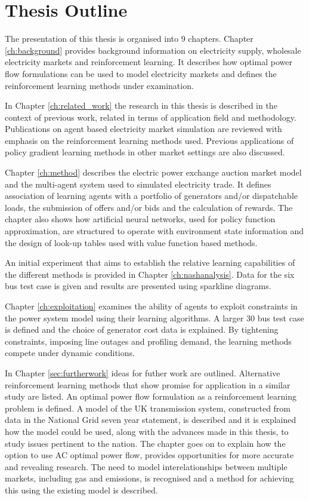 \section{Thesis Outline}
The presentation of this thesis is organised into 9 chapters.  Chapter
\ref{ch:background} provides background information on electricity supply,
wholesale electricity markets and reinforcement learning.  It describes how
optimal power flow formulations can be used to model electricity markets and
defines the reinforcement learning methods under examination.

In Chapter \ref{ch:related_work} the research in this thesis is described in
the context of previous work, related in terms of application field and
methodology.  Publications on agent based electricity market simulation are
reviewed with emphasis on the reinforcement learning methods used.
Previous applications of policy gradient learning methods in other market
settings are also discussed.

Chapter \ref{ch:method} describes the electric power exchange auction market
model and the multi-agent system used to simulated electricity trade.  It
defines association of learning agents with a portfolio of generators
and/or dispatchable loads, the submission of offers and/or bids and the
calculation of rewards. The chapter also shows how artificial neural networks,
used for policy function approximation, are structured to operate with
environment state information and the design of look-up tables used with value
function based methods.

An initial experiment that aims to establish the relative learning capabilities
of the different methods is provided in Chapter \ref{ch:nashanalysis}.  Data
for the six bus test case is given and results are presented using sparkline
diagrams.

Chapter \ref{ch:exploitation} examines the ability of agents to exploit
constraints in the power system model using their learning algorithms.  A
larger 30 bus test case is defined and the choice of generator cost data is
explained. By tightening constraints, imposing line outages and profiling
demand, the learning methods compete under dynamic conditions.

In Chapter \ref{sec:furtherwork} ideas for futher work are outlined.
Alternative reinforcement learning methods that show promise for
application in a similar study are listed.  An optimal power flow formulation
as a reinforcement learning problem is defined.  A model of the UK transmission
system, constructed from data in the National Grid seven year statement, is
described and it is explained how the model could be used, along with the
advances made in this thesis, to study issues pertinent to the nation.  The
chapter goes on to explain how the option to use AC optimal power flow,
provides opportunities for more accurate and revealing research.  The need to
model interelationships between multiple markets, including gas and emissions,
is recognised and a method for achieving this using the existing model is
described.

